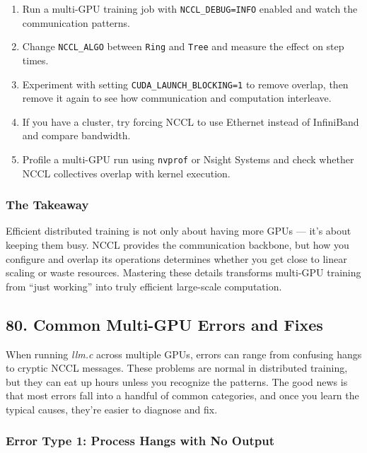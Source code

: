 \documentclass[
  letterpaper,
  DIV=11,
  numbers=noendperiod]{scrreprt}
\providecommand{\tightlist}{%
  \setlength{\itemsep}{0pt}\setlength{\parskip}{0pt}}
\begin{document}
\begin{enumerate}
\def\labelenumi{\arabic{enumi}.}
\tightlist
\item
  Run a multi-GPU training job with \texttt{NCCL\_DEBUG=INFO} enabled
  and watch the communication patterns.
\item
  Change \texttt{NCCL\_ALGO} between \texttt{Ring} and \texttt{Tree} and
  measure the effect on step times.
\item
  Experiment with setting \texttt{CUDA\_LAUNCH\_BLOCKING=1} to remove
  overlap, then remove it again to see how communication and computation
  interleave.
\item
  If you have a cluster, try forcing NCCL to use Ethernet instead of
  InfiniBand and compare bandwidth.
\item
  Profile a multi-GPU run using \texttt{nvprof} or Nsight Systems and
  check whether NCCL collectives overlap with kernel execution.
\end{enumerate}

\subsubsection{The Takeaway}\label{the-takeaway-68}

Efficient distributed training is not only about having more GPUs ---
it's about keeping them busy. NCCL provides the communication backbone,
but how you configure and overlap its operations determines whether you
get close to linear scaling or waste resources. Mastering these details
transforms multi-GPU training from ``just working'' into truly efficient
large-scale computation.

\subsection{80. Common Multi-GPU Errors and
Fixes}\label{common-multi-gpu-errors-and-fixes}

When running \emph{llm.c} across multiple GPUs, errors can range from
confusing hangs to cryptic NCCL messages. These problems are normal in
distributed training, but they can eat up hours unless you recognize the
patterns. The good news is that most errors fall into a handful of
common categories, and once you learn the typical causes, they're easier
to diagnose and fix.

\subsubsection{Error Type 1: Process Hangs with No
Output}\label{error-type-1-process-hangs-with-no-output}
\end{document}
